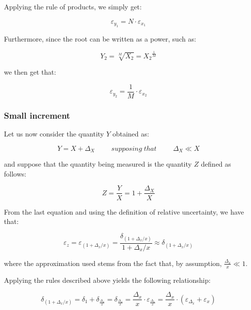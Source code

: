 \documentclass[../main.tex]{subfiles}
\begin{document}
Applying the rule of products, we simply get:

\begin{equation}
	\varepsilon_{y_1} = N \cdot \varepsilon_{x_1}
\end{equation}


Furthermore, since the root can be written as a power, such as:

\begin{equation}
	Y_2 = \sqrt[M]{X_2} = {X_2}^{\frac{1}{M}}
\end{equation}

we then get that:

\begin{equation}
	\varepsilon_{y_2} = \frac{1}{M} \cdot \varepsilon_{x_2} 
\end{equation}

\subsubsection*{Small increment}

Let us now consider the quantity $Y$ obtained as:

\begin{equation}
	Y = X + \Delta_X \hspace{1cm} \unit{supposing\;that} \hspace{1cm} \Delta_X \ll X 
\end{equation}

and suppose that the quantity being measured is the quantity $Z$ defined as follows:

\begin{equation}
	Z = \frac{Y}{X} = 1 + \frac{\Delta_X}{X}	
\end{equation}

From the last equation and using the definition of relative uncertainty, we have that:

\begin{equation}
	\varepsilon_z = \varepsilon_{(1 + \Delta_x/x)} = \frac{\delta_{(1 + \Delta_x/x)}}{1 + \Delta_x/x} \approx \delta_{(1 + \Delta_x/x)} 
\end{equation}

where the approximation used stems from the fact that, by assumption, $\frac{\Delta_x}{x}  \ll 1$. 

Applying the rules described above yields the following relationship:

\begin{equation}
	\delta_{(1+\Delta_x / x)} = \delta_1 + \delta_{\frac{\Delta_x}{x}} = \delta_{\frac{\Delta_x}{x}} = \frac{\Delta_x}{x} \cdot \varepsilon_{\frac{\Delta_x}{x}} = \frac{\Delta_x}{x} \cdot (\varepsilon_{\Delta_x} + \varepsilon_x) 
\end{equation}
\end{document}
